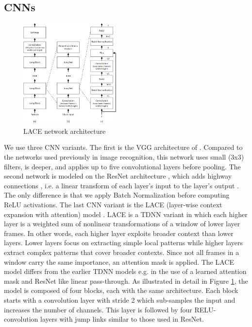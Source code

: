 \documentclass{article}
\begin{document}
\subsection{CNNs}
\begin{figure}[t]
\centering
\includegraphics[width=0.45\textwidth]{LACEAArch.png}
\caption{LACE network architecture}
\label{fig:LACE}
\end{figure}
We use three CNN variants. The first is the VGG architecture of \cite{Simonyan2014very}. Compared to the networks used previously in image recognition, this 
network uses small (3x3) filters, is deeper, and applies up to 
five convolutional layers before pooling. 
The second network is modeled on the ResNet architecture \cite{he2015deep}, 
which adds highway connections \cite{DBLP:journals/corr/SrivastavaGS15}, i.e. a linear transform of each layer's input to the layer's output
\cite{DBLP:journals/corr/SrivastavaGS15,ghahremani2016linearly}. The only difference is that we apply Batch Normalization before computing ReLU activations.
The last CNN variant is the LACE (layer-wise context expansion with attention) model \cite{yu2016deep}. LACE is a TDNN \cite{waibel1989phoneme} variant in which each higher layer is a weighted sum of nonlinear transformations of a window of lower layer frames. In other words, each higher layer exploits broader context than lower layers. Lower layers focus on extracting simple local patterns while higher layers extract complex patterns that cover broader contexts.
Since not all frames in a window carry the same importance, an attention mask is applied.
The LACE model differs from the earlier TDNN models e.g. \cite{waibel1989phoneme,waibel1989consonant} in the use of a learned attention mask and ResNet like
linear pass-through. As illustrated in detail in Figure \ref{fig:LACE}, the model is composed of four blocks, each with the same architecture. Each block starts with a convolution layer with stride 2 which sub-samples the input and increases the number of channels. This layer is followed by four RELU-convolution layers with jump links similar to those used in ResNet. 
\end{document}
